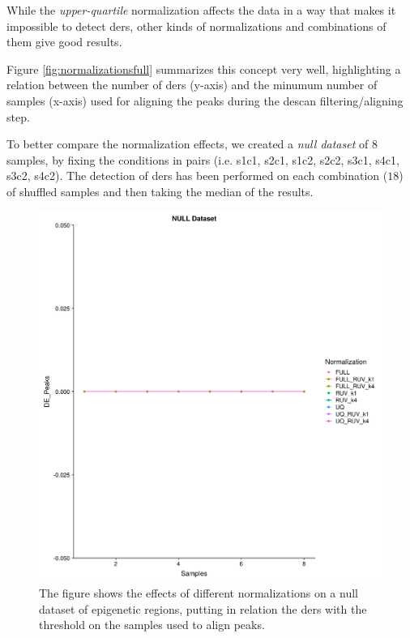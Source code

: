 While the \textit{upper-quartile} normalization affects the data in a way that makes it impossible to detect \glspl{der}, other kinds of normalizations and combinations of them give good results.

Figure \ref{fig:normalizationsfull} summarizes this concept very well, highlighting a relation between the number of \glspl{der} (y-axis) and the minumum number of samples (x-axis) used for aligning the peaks during the \gls{descan} filtering/aligning step.

To better compare the normalization effects, we created a \textit{null dataset} of 8 samples, by fixing the conditions in pairs (i.e. s1c1, s2c1, s1c2, s2c2, s3c1, s4c1, s3c2, s4c2). 
The detection of \glspl{der} has been performed on each combination ($18$) of shuffled samples and then taking the median of the results.

\begin{figure}[H]
\centering
\includegraphics[width=\textwidth, keepaspectratio]{img/descan2/null_dataset_final.pdf}
\caption[Normalizations applied to null dataset]{The figure shows the effects of different normalizations on a null dataset of epigenetic regions, putting in relation the \glspl{der} with the threshold on the samples used to align peaks.}
\label{fig:normalizationsnull}
\centering
\end{figure}

